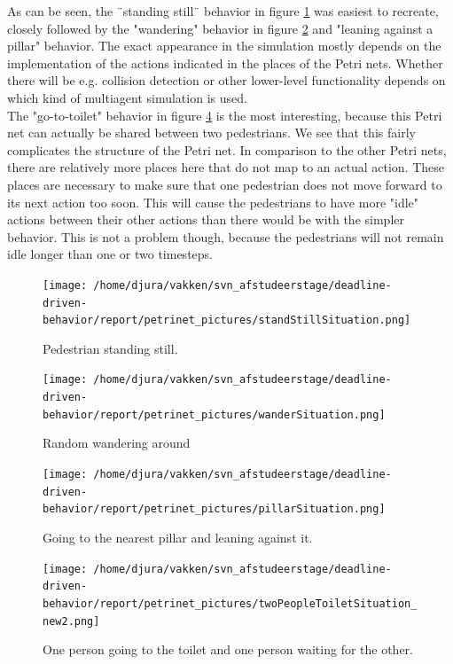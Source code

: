 \documentclass[11pt, a4paper]{book}
\begin{document}
 As can be seen, the ¨standing still¨ behavior in figure \ref{fig:standstillpetrinet} was easiest to recreate, closely followed by the "wandering" behavior in figure \ref{fig:wanderpetrinet} and "leaning against a pillar" behavior. The exact appearance in the simulation mostly depends on the implementation of the actions indicated in the places of the Petri nets. Whether there will be e.g. collision detection or other lower-level functionality depends on which kind of multiagent simulation is used.\\
 The "go-to-toilet" behavior in figure \ref{fig:gototoiletpetrinet} is the most interesting, because this Petri net can actually be shared between two pedestrians. We see that this fairly complicates the structure of the Petri net. In comparison to the other Petri nets, there are relatively more places here that do not map to an actual action. These places are necessary to make sure that one pedestrian does not move forward to its next action too soon. This will cause the pedestrians to have more "idle" actions between their other actions than there would be with the simpler behavior. This is not a problem though, because the pedestrians will not remain idle longer than one or two timesteps.

\begin{figure}[h!]
\centering            
\texttt{[image: /home/djura/vakken/svn\_afstudeerstage/deadline-driven-behavior/report/petrinet\_pictures/standStillSituation.png]}
\caption{Pedestrian standing still.}
\label{fig:standstillpetrinet}
\end{figure}

\begin{figure}[h!]
\centering            
\texttt{[image: /home/djura/vakken/svn\_afstudeerstage/deadline-driven-behavior/report/petrinet\_pictures/wanderSituation.png]}
\caption{Random wandering around}
\label{fig:wanderpetrinet}
\end{figure}

\begin{figure}[[h!]
\centering            
\texttt{[image: /home/djura/vakken/svn\_afstudeerstage/deadline-driven-behavior/report/petrinet\_pictures/pillarSituation.png]}
\caption{Going to the nearest pillar and leaning against it.}
\label{fig:pillarpetrinet}
\end{figure}

\begin{figure}[h!]
\centering            
\texttt{[image: /home/djura/vakken/svn\_afstudeerstage/deadline-driven-behavior/report/petrinet\_pictures/twoPeopleToiletSituation\_new2.png]}
\caption{One person going to the toilet and one person waiting for the other.}
\label{fig:gototoiletpetrinet}
\end{figure}
\end{document}
